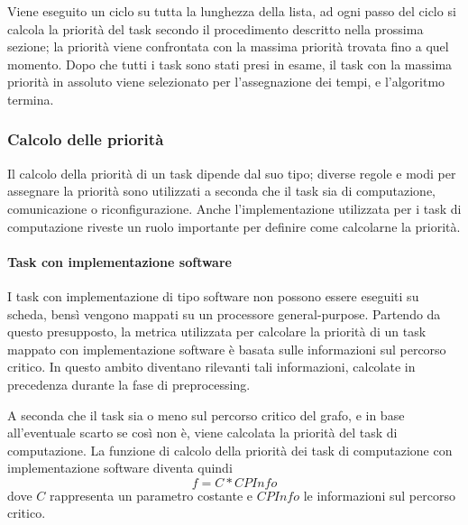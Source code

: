 Viene eseguito un ciclo su tutta la lunghezza della lista, ad ogni passo del 
ciclo si calcola la priorità del task secondo il procedimento descritto nella 
prossima sezione; la priorità viene confrontata con la massima priorità trovata 
fino a quel momento. Dopo che tutti i task sono stati presi in esame, il task 
con la massima priorità in assoluto viene selezionato per l'assegnazione dei 
tempi, e l'algoritmo termina.


\subsubsection{Calcolo delle priorità}
Il calcolo della priorità di un task dipende dal suo tipo; diverse regole e 
modi per assegnare la priorità sono utilizzati a seconda che il task sia di 
computazione, comunicazione o riconfigurazione. Anche l'implementazione 
utilizzata per i task di computazione riveste un ruolo importante per definire 
come calcolarne la priorità.

\paragraph{Task con implementazione software}
I task con implementazione di tipo software non possono essere eseguiti su 
scheda, bensì vengono mappati su un processore general-purpose. Partendo da 
questo presupposto, la metrica utilizzata per calcolare la priorità di un task 
mappato con implementazione software è basata sulle informazioni sul percorso 
critico. In questo ambito diventano rilevanti tali informazioni, calcolate 
in precedenza durante la fase di preprocessing.

A seconda che il task sia o meno sul percorso critico del grafo, e in 
base all'eventuale scarto se così non è, viene calcolata la priorità del task 
di computazione. La funzione di calcolo della priorità dei task di computazione 
con implementazione software diventa quindi
\begin{equation} \label{eq:softwarePriority}
 f=C*CPInfo
\end{equation}
dove $C$ rappresenta un parametro costante e $CPInfo$ le informazioni sul 
percorso critico.


